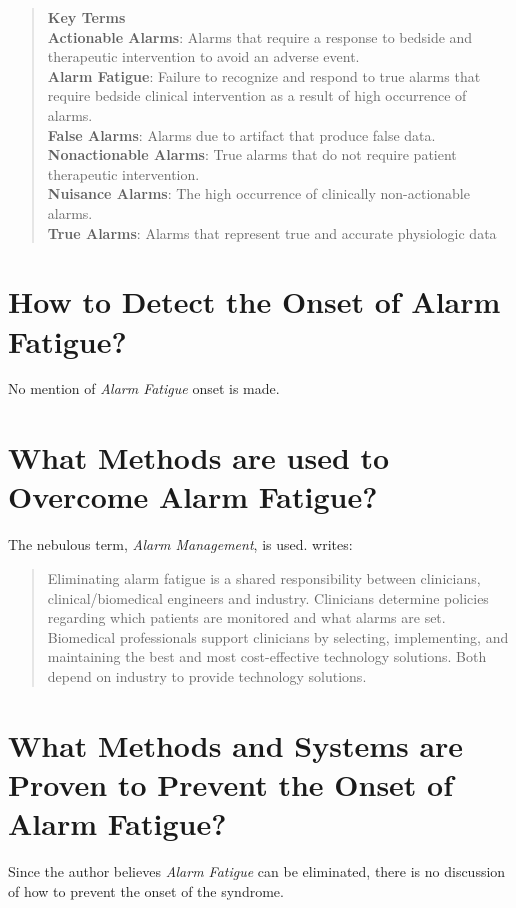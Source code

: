 \begin{quotation}
	\textbf{Key Terms} \\
	\textbf{Actionable Alarms}: Alarms that
	require a response to bedside and
	therapeutic intervention to avoid an
	adverse event. \\
	\textbf{Alarm Fatigue}: Failure to recognize
	and respond to true alarms that
	require bedside clinical intervention
	as a result of high occurrence
	of alarms. \\
	\textbf{False Alarms}: Alarms due to artifact that produce false data. \\
	\textbf{Nonactionable Alarms}: True
	alarms that do not require patient
	therapeutic intervention. \\
	\textbf{Nuisance Alarms}: The high
	occurrence of clinically non-actionable alarms. \\
	\textbf{True Alarms}: Alarms
	that represent true
	and accurate
	physiologic data
\end{quotation}

\section{How to Detect the Onset of Alarm Fatigue?}

No mention of \textit{Alarm Fatigue} onset is made.

\section{What Methods are used to Overcome Alarm Fatigue?}

The nebulous term, \textit{Alarm Management}, is used. \citet[p.51]{welch2011evidence} writes:

\begin{quotation}
	Eliminating alarm fatigue is a shared
	responsibility between clinicians, clinical/biomedical engineers and industry. Clinicians
	determine policies regarding which patients are
	monitored and what alarms are set. Biomedical
	professionals support clinicians by selecting,
	implementing, and maintaining the best and
	most cost-effective technology solutions.
	Both depend on industry to provide
	technology solutions.
\end{quotation}

\section{What Methods and Systems are Proven to Prevent the Onset of Alarm Fatigue?}

Since the author believes \textit{Alarm Fatigue} can be eliminated, there is no discussion of how to prevent the onset of the syndrome.

